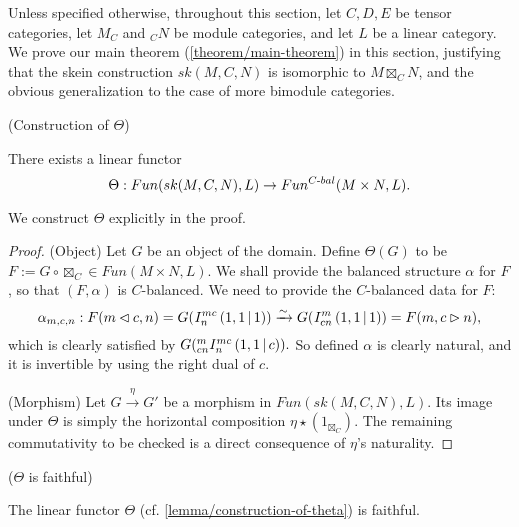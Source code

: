 Unless specified otherwise, throughout this section, let $C, D, E$ be tensor
categories, let $M_{C}$ and $_{C}N$ be module categories, and let $L$ be a
linear category. We prove our main theorem (\ref{theorem/main-theorem}) in this section, justifying
that the skein construction $sk(M,C,N)$ is isomorphic to $M \boxtimes_{C} N$, and the
obvious generalization to the case of more bimodule categories.

\begin{lemma}\label{lemma/construction-of-theta} (Construction of $\Theta$)

  \noindent There exists a linear functor
  \[
    \Theta: Fun(sk(M,C,N), L) \to Fun^{C{\text -}bal}(M \times N, L).
  \]
\end{lemma}

\noindent We construct $\Theta$ explicitly in the proof.

\begin{proof}
  \noindent (Object) Let $G$ be an object of the domain. Define $\Theta(G)$ to
  be $F := G \circ \boxtimes_{C} \in Fun(M \times N, L)$. We shall provide the
  balanced structure $\alpha$ for $F$, so that $(F, \alpha)$ is $C$-balanced. 
  We need to provide the $C$-balanced data for $F$:
  \[
    \alpha_{m,c,n}: F(m \lhd c, n) =
    G({}^{}_{} I^{mc}_{n} \left( 1, 1 \,\middle|\, 1 \right))
    \xrightarrow{\sim} G({}^{}_{} I^{m}_{cn} \left( 1, 1 \,\middle|\, 1 \right))
    = F(m, c \rhd n),
  \]
  which is clearly satisfied by $G({}^{m}_{cn} I^{mc}_{n} \left( 1, 1 \,\middle|\, c \right)).$ So defined
  $\alpha$ is clearly natural, and it is invertible by using the right dual of $c$.

  \noindent (Morphism) Let $G \xrightarrow{\eta} G'$ be a morphism in
  $Fun(sk(M,C,N), L)$. Its image under $\Theta$ is simply the horizontal
  composition $\eta \star (1_{\boxtimes_{C}})$. The remaining commutativity to be checked
  is a direct consequence of $\eta$'s naturality.
\end{proof}

\begin{lemma}\label{lemma/theta-is-faithful} ($\Theta$ is faithful)

  \noindent The linear functor $\Theta$ (cf. \ref{lemma/construction-of-theta}) is faithful.
\end{lemma}

